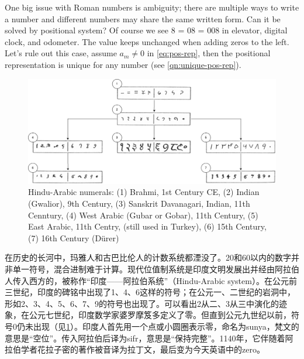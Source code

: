 \documentclass[b5paper]{article}
\begin{document}
One big issue with Roman numbers is ambiguity; there are multiple ways to write a number and different numbers may share the same written form. Can it be solved by positional system? Of course we see 8 = 08 = 008 in elevator, digital clock, and odometer. The value keeps unchanged when adding zeros to the left. Let's rule out this case, assume $a_m \ne 0$ in \cref{eq:pos-rep}, then the positional representation is unique for any number (see \cref{qn:unique-pos-rep}).

%
\begin{figure}[htbp]
 \centering
 \includegraphics[scale=0.3]{img/Hindu-arabic-num}
 \caption{Hindu-Arabic numerals: (1) Brahmi, 1st Century CE, (2) Indian (Gwalior), 9th Century, (3) Sanskrit Davanagari, Indian, 11th Cenntury, (4) West Arabic (Gubar or Gobar), 11th Century, (5) East Arabic, 11th Centry, (still used in Turkey), (6) 15th Century, (7) 16th Century (Dürer)}
 \label{fig:hindu-arabic-numerals}
\end{figure}

   \label{sec:hindu-arabic-numerals}
在历史的长河中，玛雅人和古巴比伦人的计数系统都湮没了。20和60以内的数字并非单一符号，混合进制难于计算。现代位值制系统是印度文明发展出并经由阿拉伯人传入西方的，被称作“印度——阿拉伯系统”（Hindu-Arabic system）。在公元前三世纪，印度的碑铭中出现了1、4、6这样的符号；在公元一、二世纪的岩洞中，形如2、3、4、5、6、7、9的符号也出现了。可以看出2从二、3从三中演化的迹象，在公元七世纪，印度数学家婆罗摩笈多定义了零\cite{MacTutor-Brahmagupta-2000}。但直到公元九世纪以前，符号0仍未出现（见\cref{fig:hindu-arabic-numerals}）。印度人首先用一个点或小圆圈表示零，命名为sunya，梵文的意思是“空位”。传入阿拉伯后译为sifr，意思是“保持完整”。1140年，它伴随着阿拉伯学者花拉子密的著作被音译为拉丁文，最后变为今天英语中的zero。
\end{document}
